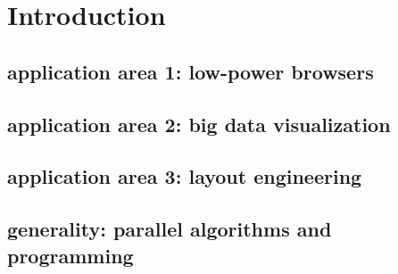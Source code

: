 \chapter{Introduction}

\section{application area 1: low-power browsers}
\section{application area 2: big data visualization}
\section{application area 3: layout engineering}
\section{generality: parallel algorithms and programming}


